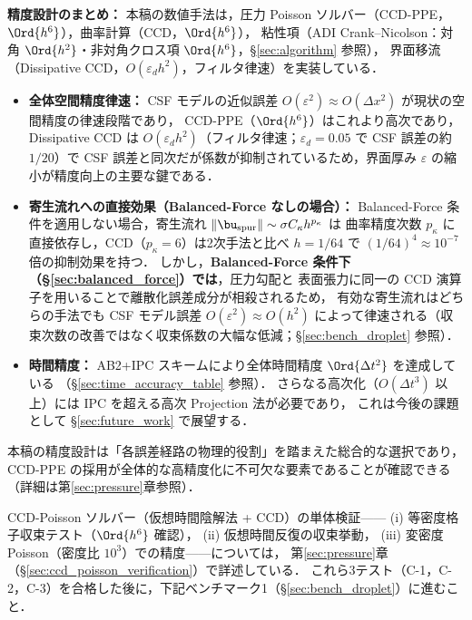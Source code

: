 \noindent\textbf{精度設計のまとめ：}
\label{sec:accuracy_summary}
本稿の数値手法は，圧力 Poisson ソルバー（CCD-PPE，$\Ord{h^6}$），曲率計算（CCD，$\Ord{h^6}$），
粘性項（ADI Crank--Nicolson：対角 $\Ord{h^2}$・非対角クロス項 $\Ord{h^6}$，§\ref{sec:algorithm} 参照），
界面移流（Dissipative CCD，$O(\varepsilon_d h^2)$，フィルタ律速）を実装している．

\begin{itemize}[noitemsep]
  \item \textbf{全体空間精度律速：} CSF モデルの近似誤差 $O(\varepsilon^2) \approx O(\Delta x^2)$ が現状の空間精度の律速段階であり，
        CCD-PPE（$\Ord{h^6}$）はこれより高次であり，Dissipative CCD は $O(\varepsilon_d h^2)$（フィルタ律速；$\varepsilon_d=0.05$ で CSF 誤差の約 $1/20$）で CSF 誤差と同次だが係数が抑制されているため，界面厚み $\varepsilon$ の縮小が精度向上の主要な鍵である．
  \item \textbf{寄生流れへの直接効果（Balanced-Force なしの場合）：}
        Balanced-Force 条件を適用しない場合，寄生流れ $\|\bu_{\text{spur}}\| \sim \sigma C_\kappa h^{p_\kappa}$ は
        曲率精度次数 $p_\kappa$ に直接依存し，CCD（$p_\kappa=6$）は2次手法と比べ
        $h=1/64$ で $(1/64)^4 \approx 10^{-7}$ 倍の抑制効果を持つ．
        しかし，\textbf{Balanced-Force 条件下（§\ref{sec:balanced_force}）では}，圧力勾配と
        表面張力に同一の CCD 演算子を用いることで離散化誤差成分が相殺されるため，
        有効な寄生流れはどちらの手法でも CSF モデル誤差 $O(\varepsilon^2) \approx O(h^2)$
        によって律速される（収束次数の改善ではなく収束係数の大幅な低減；§\ref{sec:bench_droplet} 参照）．
  \item \textbf{時間精度：} AB2+IPC スキームにより全体時間精度 $\Ord{\Delta t^2}$ を達成している
        （§\ref{sec:time_accuracy_table} 参照）．
        さらなる高次化（$O(\Delta t^3)$ 以上）には IPC を超える高次 Projection 法が必要であり，
        これは今後の課題として §\ref{sec:future_work} で展望する．
\end{itemize}
本稿の精度設計は「各誤差経路の物理的役割」を踏まえた総合的な選択であり，
CCD-PPE の採用が全体的な高精度化に不可欠な要素であることが確認できる（詳細は第\ref{sec:pressure}章参照）．

\noindent CCD-Poisson ソルバー（仮想時間陰解法 + CCD）の単体検証——
(i) 等密度格子収束テスト（$\Ord{h^6}$ 確認），
(ii) 仮想時間反復の収束挙動，
(iii) 変密度 Poisson（密度比 $10^3$）での精度——については，
第\ref{sec:pressure}章（§\ref{sec:ccd_poisson_verification}）で詳述している．
これら3テスト（C-1，C-2，C-3）を合格した後に，下記ベンチマーク1（§\ref{sec:bench_droplet}）に進むこと．
